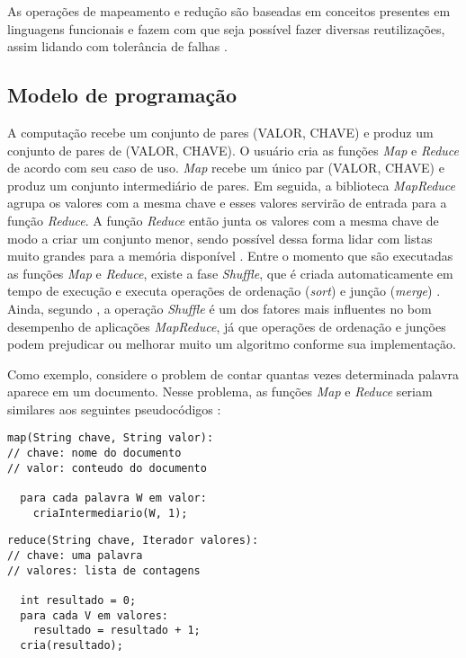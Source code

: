 As operações de mapeamento e redução são baseadas em conceitos presentes em linguagens funcionais e fazem com que seja possível fazer diversas reutilizações, assim lidando com tolerância de falhas \cite{MapReduce08}.

\subsection{Modelo de programação}\label{ssec:mapreducemodelo}

A computação recebe um conjunto de pares (VALOR, CHAVE) e produz um conjunto de pares de (VALOR, CHAVE). O usuário cria as funções \textit{Map} e \textit{Reduce} de acordo com seu caso de uso. \textit{Map} recebe um único par (VALOR, CHAVE) e produz um conjunto intermediário de pares. Em seguida, a biblioteca \textit{MapReduce} agrupa os valores com a mesma chave e esses valores servirão de entrada para a função \textit{Reduce}. A função \textit{Reduce} então junta os valores com a mesma chave de modo a criar um conjunto menor, sendo possível dessa forma lidar com listas muito grandes para a memória disponível \cite{MapReduce08}. Entre o momento que são executadas as funções \textit{Map} e \textit{Reduce}, existe a fase \textit{Shuffle}, que é criada automaticamente em tempo de execução e executa operações de ordenação (\textit{sort}) e junção (\textit{merge}) \cite{ProHadoop09}. Ainda, segundo \textcite{HadoopBook15}, a operação \textit{Shuffle} é um dos fatores mais influentes no bom desempenho de aplicações \textit{MapReduce}, já que operações de ordenação e junções podem prejudicar ou melhorar muito um algoritmo conforme sua implementação.

Como exemplo, considere o problem de contar quantas vezes determinada palavra aparece em um documento. Nesse problema, as funções \textit{Map} e \textit{Reduce} seriam similares aos seguintes pseudocódigos \cite{MapReduce08}:

\begin{lstlisting}[caption={Exemplo de função Map em pseudocódigo adaptado de \cite{MapReduce08}}, label=code:codigo1]
map(String chave, String valor):
// chave: nome do documento
// valor: conteudo do documento

  para cada palavra W em valor:
    criaIntermediario(W, 1);
\end{lstlisting}

\begin{lstlisting}[caption={Exemplo de função Reduce em pseudocódigo adaptado de \cite{MapReduce08}}, label=code:codigo2]
reduce(String chave, Iterador valores):
// chave: uma palavra
// valores: lista de contagens

  int resultado = 0;
  para cada V em valores:
    resultado = resultado + 1;
  cria(resultado);
\end{lstlisting}

